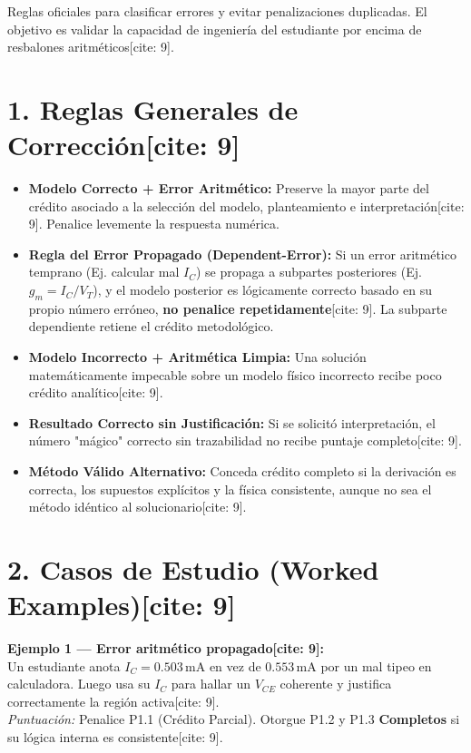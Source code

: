 \documentclass[11pt, a4paper]{article}
\begin{document}
\begin{tcolorbox}[colback=red!5, colframe=red!70!black, title=\textbf{Marco de Crédito Parcial (Partial-Credit Framework)[cite: 9]}]
    Reglas oficiales para clasificar errores y evitar penalizaciones duplicadas. El objetivo es validar la capacidad de ingeniería del estudiante por encima de resbalones aritméticos[cite: 9].
\end{tcolorbox}

\section*{1. Reglas Generales de Corrección[cite: 9]}

\begin{itemize}
    \item \textbf{Modelo Correcto + Error Aritmético:} Preserve la mayor parte del crédito asociado a la selección del modelo, planteamiento e interpretación[cite: 9]. Penalice levemente la respuesta numérica.
    \item \textbf{Regla del Error Propagado (Dependent-Error):} Si un error aritmético temprano (Ej. calcular mal $I_C$) se propaga a subpartes posteriores (Ej. $g_m = I_C/V_T$), y el modelo posterior es lógicamente correcto basado en su propio número erróneo, \textbf{no penalice repetidamente}[cite: 9]. La subparte dependiente retiene el crédito metodológico.
    \item \textbf{Modelo Incorrecto + Aritmética Limpia:} Una solución matemáticamente impecable sobre un modelo físico incorrecto recibe poco crédito analítico[cite: 9].
    \item \textbf{Resultado Correcto sin Justificación:} Si se solicitó interpretación, el número "mágico" correcto sin trazabilidad no recibe puntaje completo[cite: 9].
    \item \textbf{Método Válido Alternativo:} Conceda crédito completo si la derivación es correcta, los supuestos explícitos y la física consistente, aunque no sea el método idéntico al solucionario[cite: 9].
\end{itemize}

\section*{2. Casos de Estudio (Worked Examples)[cite: 9]}

\textbf{Ejemplo 1 — Error aritmético propagado[cite: 9]:} \\
Un estudiante anota $I_C = 0.503\,\text{mA}$ en vez de $0.553\,\text{mA}$ por un mal tipeo en calculadora. Luego usa su $I_C$ para hallar un $V_{CE}$ coherente y justifica correctamente la región activa[cite: 9]. \\
\textit{Puntuación:} Penalice P1.1 (Crédito Parcial). Otorgue P1.2 y P1.3 \textbf{Completos} si su lógica interna es consistente[cite: 9].
\end{document}
